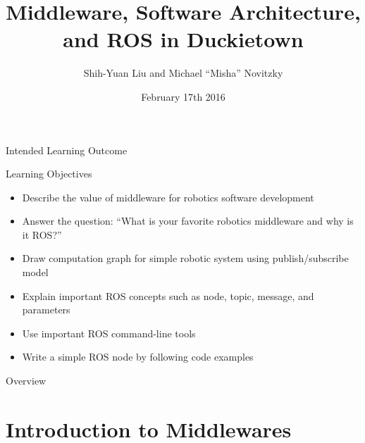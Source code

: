 \documentclass[aspectratio=43]{beamer}
\author[S.-Y.Liu, M. Novitzky]{Shih-Yuan Liu and Michael ``Misha'' Novitzky}
\title[ROS in Duckietown]{Middleware, Software Architecture, and ROS in Duckietown}
\institute[Duckietown MIT]{Duckietown, MIT}
\date[Feb. 17th, 2016]{February 17th 2016}
\begin{document}

\begin{frame}[plain,label=titlepage,noframenumbering] %
	\titlepage
\end{frame}

\begin{frame}{Intended Learning Outcome}
	\begin{block}{Learning Objectives}
		\begin{itemize}
			\item Describe the value of middleware for robotics software development
			\item Answer the question: ``What is your favorite robotics middleware and why is it ROS?''
			\item Draw computation graph for simple robotic system using publish/subscribe model
			\item Explain important ROS concepts such as node, topic, message, and parameters
			\item Use important ROS command-line tools
			\item Write a simple ROS node by following code examples
		\end{itemize}
	\end{block}
\end{frame}

\begin{frame}[label=overview]{Overview}
	\tableofcontents
\end{frame}

\section{Introduction to Middlewares}

\end{document}
